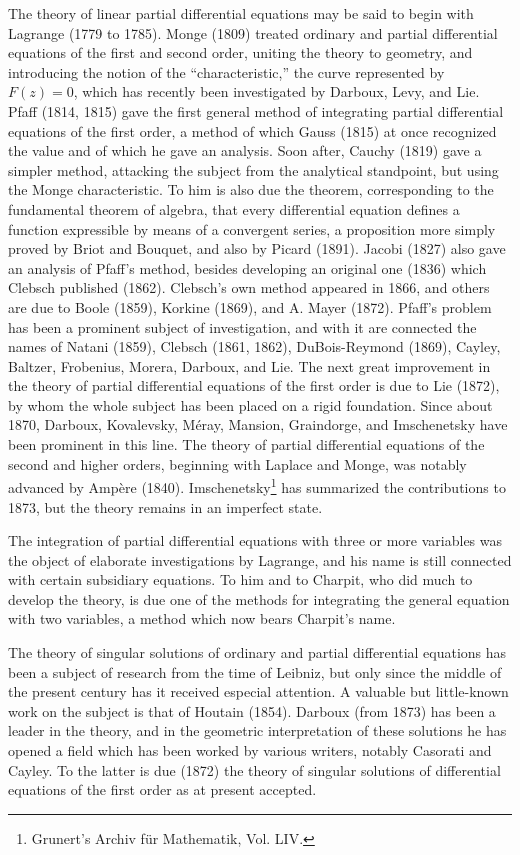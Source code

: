 \documentclass[oneside]{book}
\begin{document}
The theory of linear partial differential equations may be said to
begin with Lagrange (1779 to 1785). Monge (1809) treated ordinary
and partial differential equations of the first and second order,
uniting the theory to geometry, and introducing the notion of the
``characteristic,'' the curve represented by $F(z) = 0$, which has
recently been investigated by Darboux, Levy, and Lie. Pfaff (1814,
1815) gave the first general method of integrating partial
differential equations of the first order, a method of which Gauss
(1815) at once recognized the value and of which he gave an
analysis. Soon after, Cauchy (1819) gave a simpler method, attacking
the subject from the analytical standpoint, but using the Monge
characteristic. To him is also due the theorem, corresponding to the
fundamental theorem of algebra, that every differential equation
defines a function expressible by means of a convergent series, a
proposition more simply proved by Briot and Bouquet, and also by
Picard (1891). Jacobi (1827) also gave an analysis of Pfaff's
method, besides developing an original one (1836) which Clebsch
published (1862). Clebsch's own method appeared in 1866, and others
are due to Boole (1859), Korkine (1869), and A. Mayer
(1872). Pfaff's problem has been a prominent subject of
investigation, and with it are connected the names of Natani (1859),
Clebsch (1861, 1862), DuBois-Reymond (1869), Cayley, Baltzer,
Frobenius, Morera, Darboux, and Lie. The next great improvement in
the theory of partial differential equations of the first order is
due to Lie (1872), by whom the whole subject has been placed on a
rigid foundation. Since about 1870, Darboux, Kovalevsky, M\'eray,
Mansion, Graindorge, and Imschenetsky have been prominent in this
line. The theory of partial differential equations of the second
and higher orders, beginning with Laplace and Monge, was notably
advanced by Amp\`ere (1840). Imschenetsky\footnote{Grunert's Archiv
f\"ur Mathematik, Vol. LIV.} has summarized the contributions to
1873, but the theory remains in an imperfect state.

The integration of partial differential equations with three or more
variables was the object of elaborate investigations by Lagrange,
and his name is still connected with certain subsidiary
equations. To him and to Charpit, who did much to develop the
theory, is due one of the methods for integrating the general
equation with two variables, a method which now bears Charpit's name.

The theory of singular solutions of ordinary and partial
differential equations has been a subject of research from the time
of Leibniz, but only since the middle of the present century has it
received especial attention. A valuable but little-known work on the
subject is that of Houtain (1854). Darboux (from 1873) has been a
leader in the theory, and in the geometric interpretation of these
solutions he has opened a field which has been worked by various
writers, notably Casorati and Cayley. To the latter is due (1872)
the theory of singular solutions of differential equations of the
first order as at present accepted.
\end{document}
